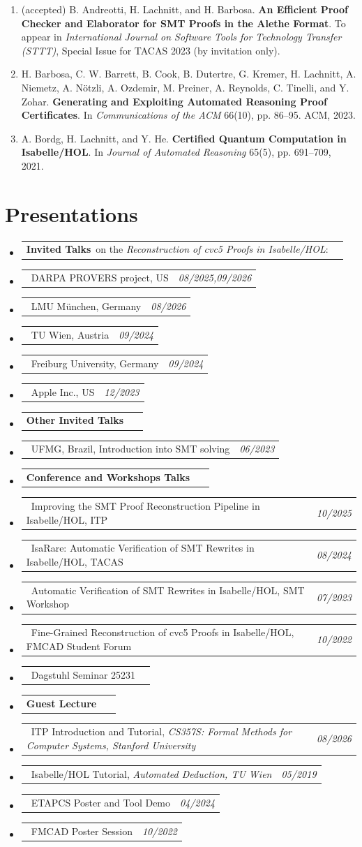 \documentclass[a4paper,11pt]{article}
\makeatletter
\newif\ifhangingheadings
\newlength{\cvdetailindent}
\newcommand{\resumePOR}[3]{
\vspace{0.5mm}\item
    \begin{tabular*}{0.97\textwidth}[t]{l@{\extracolsep{\fill}}r}
        \if\relax\detokenize{#1}\relax\else\textbf{#1}\ \fi#2 & \textit{\small{#3}} 
    \end{tabular*}
    \vspace{-2mm}
}
\newcommand{\resumeSubHeadingListStart}{\ifhangingheadings
  \begin{itemize}[label={},leftmargin=\cvdetailindent,itemindent=-\cvdetailindent,labelwidth=0pt,labelsep=0pt]
  \else\begin{itemize}[leftmargin=*,labelsep=1mm]\fi}
\newcommand{\resumeSubHeadingListEnd}{\end{itemize}\vspace{2mm}}
\newcommand{\cvsubsection}[1]{\vspace{1mm}{\underline{\textit{\textbf{#1}}}}\par\vspace{-3.5mm}}
\makeatother
\begin{document}
\small{
	\vspace{1.7mm}
\begin{enumerate}[resume*=pubs]
\item\label{pub:sttt} (accepted) B. Andreotti, H. Lachnitt, and H. Barbosa. \textbf{An Efficient Proof Checker and Elaborator for SMT Proofs in the Alethe Format}. To appear in \textit{International Journal on Software Tools for Technology Transfer (STTT)}, Special Issue for TACAS 2023 (by invitation only).

\item\label{pub:cacm23} H. Barbosa, C. W. Barrett, B. Cook, B. Dutertre, G. Kremer, H. Lachnitt, A. Niemetz, A. Nötzli, A. Ozdemir, M. Preiner, A. Reynolds, C. Tinelli, and Y. Zohar. \textbf{Generating and Exploiting Automated Reasoning Proof Certificates}. In \textit{Communications of the ACM} 66(10), pp. 86--95. ACM, 2023.

\item\label{pub:jar21} A. Bordg, H. Lachnitt, and Y. He. \textbf{Certified Quantum Computation in Isabelle/HOL}. In \textit{Journal of Automated Reasoning} 65(5), pp. 691--709, 2021.
\end{enumerate}
}

\section{\textbf{Presentations}}
\vspace{-0.4mm}
\cvsubsection{Selected Talks}

\resumeSubHeadingListStart
\resumePOR{Invited Talks}{on the \textit{Reconstruction of cvc5 Proofs in Isabelle/HOL}:}{}
\resumePOR{}{DARPA PROVERS project, US}{08/2025,09/2026}
\resumePOR{}{LMU München, Germany}{08/2026}
\resumePOR{}{TU Wien, Austria}{09/2024}
\resumePOR{}{Freiburg University, Germany}{09/2024}
\resumePOR{}{Apple Inc., US}{12/2023}

\resumePOR{Other Invited Talks}{}{}

\resumePOR{}{UFMG, Brazil, Introduction into SMT solving}{06/2023}
\resumePOR{Conference and Workshops Talks}{}{}
\resumePOR{}{Improving the SMT Proof Reconstruction Pipeline in Isabelle/HOL, ITP}{10/2025}
\resumePOR{}{IsaRare: Automatic Verification of SMT Rewrites in Isabelle/HOL, TACAS}{08/2024}
\resumePOR{}{Automatic Verification of SMT Rewrites in Isabelle/HOL, SMT Workshop}{07/2023}
\resumePOR{}{Fine-Grained Reconstruction of cvc5 Proofs in Isabelle/HOL, FMCAD Student Forum}{10/2022}

\resumePOR{}{Dagstuhl Seminar 25231}{}

\resumePOR{Guest Lecture}{}{}
\resumePOR{}{ITP Introduction and Tutorial, \textit{CS357S: Formal Methods for Computer Systems, Stanford University}}{08/2026}
\resumePOR{}{Isabelle/HOL Tutorial, \textit{Automated Deduction, TU Wien}}{05/2019}
\resumeSubHeadingListEnd
\vspace{-0.4mm}
\cvsubsection{Posters}

\resumeSubHeadingListStart
\resumePOR{}{ETAPCS Poster and Tool Demo}{04/2024}
\resumePOR{}{FMCAD Poster Session}{10/2022}
\resumeSubHeadingListEnd
\vspace{-6mm}
\end{document}
